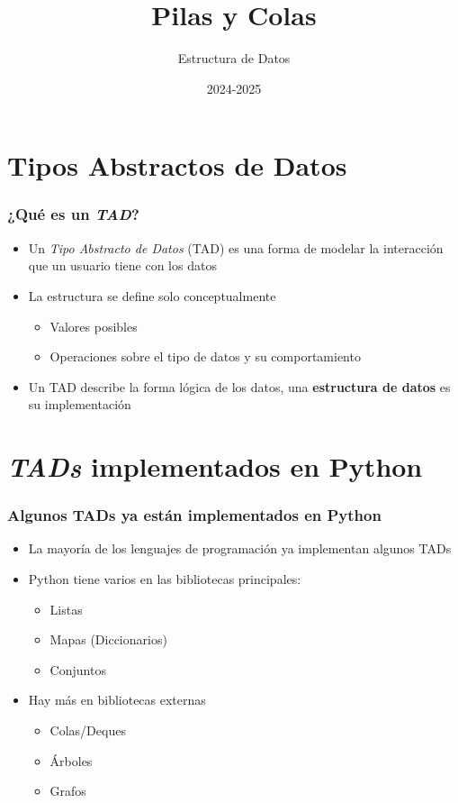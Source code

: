 \documentclass[11pt]{beamer}
\author{Estructura de Datos}
\title{\huge{Pilas y Colas}}
\date[]{2024-2025}
\begin{document}
\begin{frame}[plain]
	\maketitle
\end{frame}

\begin{frame}
	\tableofcontents
\end{frame}

\section{Tipos Abstractos de Datos}

\begin{frame}\frametitle{¿Qué es un \textit{TAD}?}
\begin{itemize}
\item Un \textit{Tipo Abstracto de Datos} (TAD) es una forma de modelar la interacción que un usuario tiene con los datos
\item La estructura se define solo conceptualmente
    \begin{itemize}
    \item Valores posibles
    \item Operaciones sobre el tipo de datos y su comportamiento
    \end{itemize}
\item Un TAD describe la forma lógica de los datos, una \textbf{estructura de datos} es su implementación
\end{itemize}
\end{frame}

\section{\textit{TADs} implementados en Python}

\begin{frame}\frametitle{Algunos TADs ya están implementados en Python}
\begin{itemize}
\item La mayoría de los lenguajes de programación ya implementan algunos TADs
\item Python tiene varios en las bibliotecas principales:
    \begin{itemize}
    \item Listas
    \item Mapas (Diccionarios)
    \item Conjuntos
    \end{itemize}
\item Hay más en bibliotecas externas
    \begin{itemize}
    \item Colas/Deques
    \item Árboles
    \item Grafos
    \end{itemize}
\end{itemize}
\end{frame}
\end{document}
